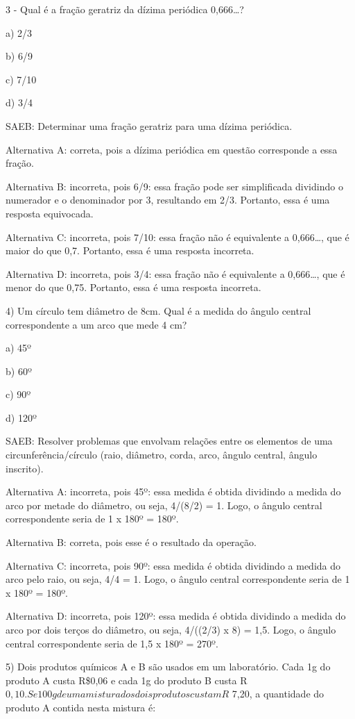 3 - Qual é a fração geratriz da dízima periódica 0,666\ldots?

a) 2/3

b) 6/9

c) 7/10

d) 3/4

SAEB: Determinar uma fração geratriz para uma dízima periódica.

Alternativa A: correta, pois a dízima periódica em questão corresponde a
essa fração.

Alternativa B: incorreta, pois 6/9: essa fração pode ser simplificada
dividindo o numerador e o denominador por 3, resultando em 2/3.
Portanto, essa é uma resposta equivocada.

Alternativa C: incorreta, pois 7/10: essa fração não é equivalente a
0,666\ldots, que é maior do que 0,7. Portanto, essa é uma resposta
incorreta.

Alternativa D: incorreta, pois 3/4: essa fração não é equivalente a
0,666\ldots, que é menor do que 0,75. Portanto, essa é uma resposta
incorreta.

4) Um círculo tem diâmetro de 8cm. Qual é a medida do ângulo central
correspondente a um arco que mede 4 cm?

a) 45º

b) 60º

c) 90º

d) 120º

SAEB: Resolver problemas que envolvam relações entre os elementos de uma
circunferência/círculo (raio, diâmetro, corda, arco, ângulo central,
ângulo inscrito).

Alternativa A: incorreta, pois 45º: essa medida é obtida dividindo a
medida do arco por metade do diâmetro, ou seja, 4/(8/2) = 1. Logo, o
ângulo central correspondente seria de 1 x 180º = 180º.

Alternativa B: correta, pois esse é o resultado da operação.

Alternativa C: incorreta, pois 90º: essa medida é obtida dividindo a
medida do arco pelo raio, ou seja, 4/4 = 1. Logo, o ângulo central
correspondente seria de 1 x 180º = 180º.

Alternativa D: incorreta, pois 120º: essa medida é obtida dividindo a
medida do arco por dois terços do diâmetro, ou seja, 4/((2/3) x 8) =
1,5. Logo, o ângulo central correspondente seria de 1,5 x 180º = 270º.

5) Dois produtos químicos A e B são usados em um laboratório. Cada 1g do
produto A custa R\$0,06 e cada 1g do produto B custa
R\(0,10. Se 100g de uma mistura dos dois produtos custam R\) 7,20, a
quantidade do produto A contida nesta mistura é:

